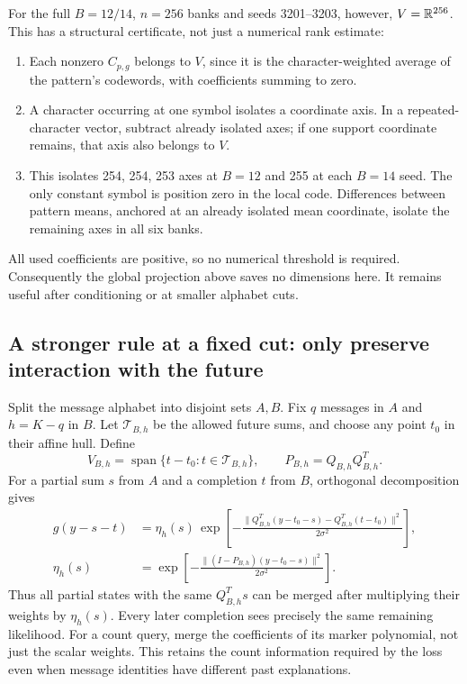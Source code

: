\documentclass[10pt,a4paper]{article}
\begin{document}
For the full $B=12/14$, $n=256$ banks and seeds 3201--3203, however, $V=\mathbb{R}^{256}$.
This has a structural certificate, not just a numerical rank estimate:
\begin{enumerate}
\item Each nonzero $C_{p,g}$ belongs to $V$, since it is the character-weighted average of the pattern's
      codewords, with coefficients summing to zero.
\item A character occurring at one symbol isolates a coordinate axis. In a repeated-character vector, subtract
      already isolated axes; if one support coordinate remains, that axis also belongs to $V$.
\item This isolates 254, 254, 253 axes at $B=12$ and 255 at each $B=14$ seed. The only constant symbol is
      position zero in the local code. Differences between pattern means, anchored at an already isolated
      mean coordinate, isolate the remaining axes in all six banks.
\end{enumerate}
All used coefficients are positive, so no numerical threshold is required. Consequently the global projection
above saves no dimensions here. It remains useful after conditioning or at smaller alphabet cuts.

\clearpage
\subsection{A stronger rule at a fixed cut: only preserve interaction with the future}
Split the message alphabet into disjoint sets $A,B$. Fix $q$ messages in $A$ and $h=K-q$ in $B$.
Let $\mathcal T_{B,h}$ be the allowed future sums, and choose any point $t_0$ in their affine hull. Define
\[
 V_{B,h}=\operatorname{span}\{t-t_0:t\in\mathcal T_{B,h}\},\qquad P_{B,h}=Q_{B,h}Q_{B,h}^T.
\]
For a partial sum $s$ from $A$ and a completion $t$ from $B$, orthogonal decomposition gives
\begin{align}
 g(y-s-t)
 &=\eta_h(s)\,
 \exp\!\left[-\frac{\|Q_{B,h}^T(y-t_0-s)-Q_{B,h}^T(t-t_0)\|^2}{2\sigma^2}\right],
 \label{eq:continuation-projection}\\
 \eta_h(s)&=\exp\!\left[-\frac{\|(I-P_{B,h})(y-t_0-s)\|^2}{2\sigma^2}\right].
 \nonumber
\end{align}
Thus all partial states with the same $Q_{B,h}^Ts$ can be merged after multiplying their weights by
$\eta_h(s)$. Every later completion sees precisely the same remaining likelihood. For a count query, merge
the coefficients of its marker polynomial, not just the scalar weights. This retains the count information
required by the loss even when message identities have different past explanations.
\end{document}
